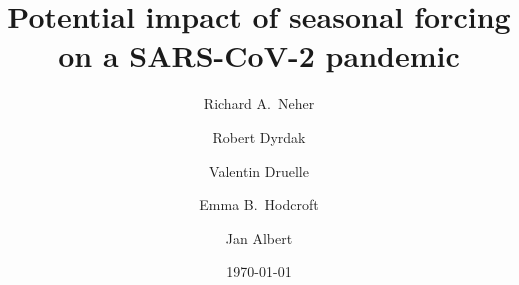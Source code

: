 \documentclass[rmp, reprint, superscriptaddress, floatfix,amsmath]{revtex4-1}
\begin{document}
\title{Potential impact of seasonal forcing on a SARS-CoV-2 pandemic}

\author{Richard A.~Neher}
\address{Biozentrum, University of Basel, Basel, Switzerland }
\address{Swiss Institute of Bioinformatics, Basel, Switzerland }
\author{Robert Dyrdak}
\address{Department of Clinical Microbiology, Karolinska University Hospital, Stockholm, Sweden }
\address{Department of Microbiology, Tumor and Cell Biology, Karolinska Institute, Stockholm, Sweden }
\author{Valentin Druelle}
\address{Biozentrum, University of Basel, Basel, Switzerland }
\address{Swiss Institute of Bioinformatics, Basel, Switzerland }
\author{Emma B.~Hodcroft}
\address{Biozentrum, University of Basel, Basel, Switzerland }
\address{Swiss Institute of Bioinformatics, Basel, Switzerland }
\author{Jan Albert}
\address{Department of Clinical Microbiology, Karolinska University Hospital, Stockholm, Sweden }
\address{Department of Microbiology, Tumor and Cell Biology, Karolinska Institute, Stockholm, Sweden }

\date{\today}
\end{document}
